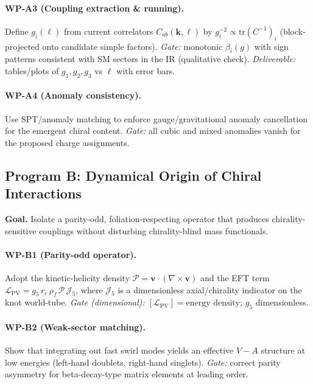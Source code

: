 \documentclass[smallextended]{svjour3}       %
\newcommand{\rhof}{\rhoF}               %
\newcommand{\rhoF}{\rho_{\!f}}      %
\begin{document}
    \paragraph{WP-A3 (Coupling extraction \& running).}
    Define $g_i(\ell)$ from current correlators $C_{ab}(\mathbf{k},\ell)$ by $g_i^{-2}\!\propto\!\mathrm{tr}(C^{-1})_i$ (block-projected onto candidate simple factors).
    \emph{Gate:} monotonic $\beta_i(g)$ with sign patterns consistent with SM sectors in the IR (qualitative check).
    \emph{Deliverable:} tables/plots of $g_1,g_2,g_3$ vs $\ell$ with error bars.

    \paragraph{WP-A4 (Anomaly consistency).}
    Use SPT/anomaly matching \cite{Wen2013_Anomalies} to enforce gauge/gravitational anomaly cancellation for the emergent chiral content.
    \emph{Gate:} all cubic and mixed anomalies vanish for the proposed charge assignments.

    \subsection*{Program B: Dynamical Origin of Chiral Interactions}
    \textbf{Goal.} Isolate a parity-odd, foliation-respecting operator that produces chirality-sensitive couplings without disturbing chirality-blind mass functionals.

    \paragraph{WP-B1 (Parity-odd operator).}
    Adopt the kinetic-helicity density $\mathcal{P}=\mathbf{v}\cdot(\nabla\times\mathbf{v})$ \cite{Moffatt1969} and the EFT term
    $\mathcal{L}_{\mathrm{PV}} = g_5\, r_c\, \rhof\, \mathcal{P}\, \mathcal{J}_5$,
    where $\mathcal{J}_5$ is a dimensionless axial/chirality indicator on the knot world-tube.
    \emph{Gate (dimensional):} $[\mathcal{L}_{\mathrm{PV}}]=\text{energy density}$; $g_5$ dimensionless.

    \paragraph{WP-B2 (Weak-sector matching).}
    Show that integrating out fast swirl modes yields an effective $V\!-\!A$ structure at low energies (left-hand doublets, right-hand singlets).
    \emph{Gate:} correct parity asymmetry for beta-decay-type matrix elements \cite{LeeYang1956,Wu1957} at leading order.
\end{document}
